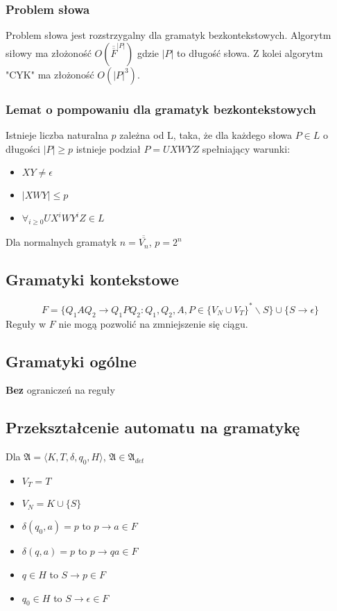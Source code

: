 \documentclass{../notatki}
\begin{document}
\subsubsection{Problem słowa}

Problem słowa jest rozstrzygalny dla gramatyk bezkontekstowych.
Algorytm siłowy ma złożoność $O(\overline{\overline{F}}^{|P|})$ gdzie $|P|$ to
długość słowa. Z kolei algorytm "CYK" ma złożoność $O(|P|^3)$.

\subsubsection{Lemat o pompowaniu dla gramatyk bezkontekstowych}

Istnieje liczba naturalna $p$ zależna od L, taka, że dla każdego słowa $P \in L$
o długości $|P| \ge p$ istnieje podział $P = UXWYZ$ spełniający warunki:

\begin{itemize}
  \item $XY \ne \epsilon$
  \item $|XWY| \le p$
  \item $\forall_{i \ge 0} UX^iWY^iZ \in L$
\end{itemize}

Dla normalnych gramatyk $n = \overline{\overline{V_n}}$, $p=2^n$

\subsection{Gramatyki kontekstowe}

$$
F = \{Q_1AQ_2 \rightarrow Q_1PQ_2 : Q_1, Q_2, A, P \in \{V_N \cup
V_T\}^* \backslash S\} \cup \{S \rightarrow \epsilon\}
$$
Reguły w $F$ nie mogą pozwolić na zmniejszenie się ciągu.

\subsection{Gramatyki ogólne}

\textbf{Bez} ograniczeń na reguły

\subsection{Przekształcenie automatu na gramatykę}

Dla $\mathfrak{A} = \langle K,T,\delta,q_0,H \rangle$, $\mathfrak{A}
\in \mathfrak{A}_{det}$

\begin{itemize}
  \item $V_T = T$
  \item $V_N = K \cup \{S\}$
  \item $\delta(q_0, a) = p$ to $p \rightarrow a \in F$
  \item $\delta(q, a) = p$ to $p \rightarrow qa \in F$
  \item $q \in H$ to $S \rightarrow p \in F$
  \item $q_0 \in H$ to $S \rightarrow \epsilon \in F$
\end{itemize}
\end{document}
